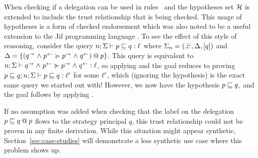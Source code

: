 When checking if a delegation can be used in rules~ and  the hypotheses set $\Assumps$ is extended to include the trust relationship that is being checked. This usage of hypotheses is a form of checked endorsement which was also noted to be a useful extension to the Jif programming language \cite{Chong:2007:SWA:1294261.1294265}.
To see the effect of this style of reasoning, consider the query $\flowstoquery{n; \env}{p}{q}{\level}$ where $\env_n = (\botinfoflow, \scope, \lbrack q \rbrack)$ and $\scope = \{\lb{p}{(\conf{q} \conj \integ{p} \actsfor \conf{p} \conj \integ{q})} \}$. This query is equivalent to $\actsforquery{n; \env}{\conf{q} \conj \integ{p}}{\conf{p} \conj \integ{q}}{\level}$, so applying  and  the goal reduces to proving $\flowstoquery{p \flowsto q; n; \env}{p}{q}{\level'}$ for some $\level'$, which (ignoring the hypothesis) is the exact same query we started out with! However, we now have the hypothesis $p \flowsto q$, and the goal follows by applying .

If no assumption was added when checking that the label on the delegation $\lb{p}{p \flowsto q}$ flows to the strategy principal $q$, this trust relationship could not be proven in any finite derivation. While this situation might appear synthetic, Section~\ref{sec:case-studies} will demonstrate a less synthetic use case where this problem shows up.

